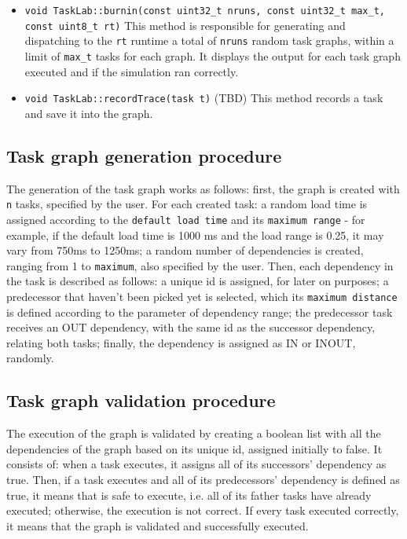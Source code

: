 \begin{itemize}
\item \texttt{void TaskLab::burnin(const uint32\_t nruns, const uint32\_t max\_t, const uint8\_t rt)} \newline
This method is responsible for generating and dispatching to the \texttt{rt} runtime a total of \texttt{nruns} random task graphs, within a limit of \texttt{max\_t} tasks for each graph. It displays the output for each task graph executed and if the simulation ran correctly.

\item \texttt{void TaskLab::recordTrace(task t)} (TBD) \newline
This method records a task and save it into the graph.

\end{itemize}

\subsection{Task graph generation procedure}
The generation of the task graph works as follows: first, the graph is created with \texttt{n} tasks, specified by the user. For each created task: a random load time is assigned according to the \texttt{default load time} and its \texttt{maximum range} - for example, if the default load time is 1000 ms and the load range is 0.25, it may vary from 750ms to 1250ms; a random number of dependencies is created, ranging from 1 to \texttt{maximum}, also specified by the user.   Then, each dependency in the task is described as follows: a unique id is assigned, for later on purposes; a predecessor that haven't been picked yet is selected, which its \texttt{maximum distance} is defined according to the parameter of dependency range; the predecessor task receives an OUT dependency, with the same id as the successor dependency, relating both tasks; finally, the dependency is assigned as IN or INOUT, randomly. 

\subsection{Task graph validation procedure}
The execution of the graph is validated by creating a boolean list with all the dependencies of the graph based on its unique id, assigned initially to false. It consists of: when a task executes, it assigns all of its successors' dependency as true. Then, if a task executes and all of its predecessors' dependency is defined as true, it means that is safe to execute, i.e. all of its father tasks have already executed; otherwise, the execution is not correct. If every task executed correctly, it means that the graph is validated and successfully executed.

